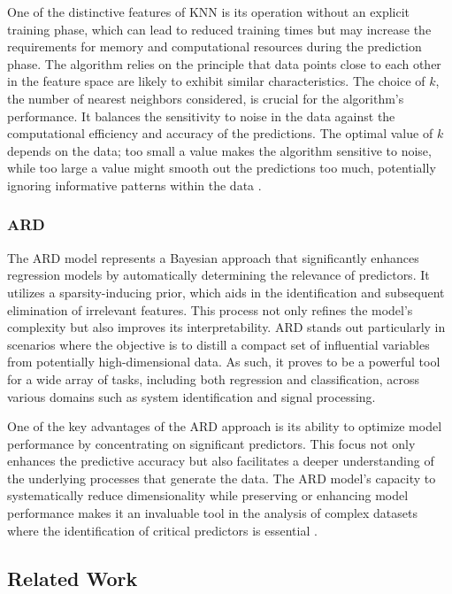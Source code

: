 \documentclass{article} %
\begin{document}
One of the distinctive features of \gls{KNN} is its operation without an explicit training phase, which can lead to reduced training times but may increase the requirements for memory and computational resources during the prediction phase. The algorithm relies on the principle that data points close to each other in the feature space are likely to exhibit similar characteristics. The choice of \(k\), the number of nearest neighbors considered, is crucial for the algorithm's performance. It balances the sensitivity to noise in the data against the computational efficiency and accuracy of the predictions. The optimal value of \(k\) depends on the data; too small a value makes the algorithm sensitive to noise, while too large a value might smooth out the predictions too much, potentially ignoring informative patterns within the data \cite{cover1967nearest}.


\subsubsection{ARD}
The \gls{ARD} model represents a Bayesian approach that significantly enhances regression models by automatically determining the relevance of predictors. It utilizes a sparsity-inducing prior, which aids in the identification and subsequent elimination of irrelevant features. This process not only refines the model's complexity but also improves its interpretability. \gls{ARD} stands out particularly in scenarios where the objective is to distill a compact set of influential variables from potentially high-dimensional data. As such, it proves to be a powerful tool for a wide array of tasks, including both regression and classification, across various domains such as system identification and signal processing.

One of the key advantages of the \gls{ARD} approach is its ability to optimize model performance by concentrating on significant predictors. This focus not only enhances the predictive accuracy but also facilitates a deeper understanding of the underlying processes that generate the data. The \gls{ARD} model's capacity to systematically reduce dimensionality while preserving or enhancing model performance makes it an invaluable tool in the analysis of complex datasets where the identification of critical predictors is essential \cite{qi2004predictive, rudy2021sparse}.


\subsection{Related Work}
\end{document}
